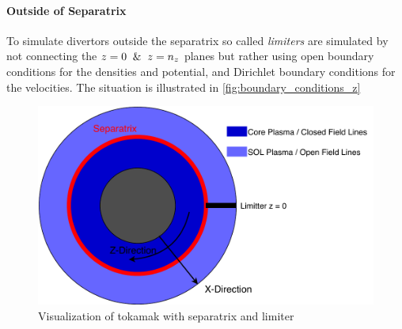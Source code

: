 \paragraph{Outside of Separatrix}
To simulate  divertors outside the separatrix so called \textit{limiters} are simulated by not connecting the $z=0 \And z=n_z$ planes but rather using open boundary conditions for the densities and potential, and Dirichlet boundary conditions for the velocities. The situation is illustrated in \autoref{fig:boundary_conditions_z}
\begin{figure}[ht]
    \centering
    \includegraphics[width=\linewidth]{pdfs/boundary_conditions_z.pdf}
    \caption{Visualization of tokamak with separatrix and limiter}
    \label{fig:boundary_conditions_z}
\end{figure}
